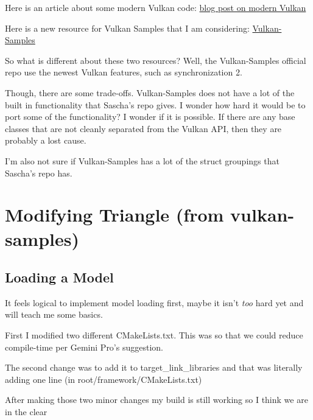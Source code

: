 \documentclass{article}
\begin{document}
\par Here is an article about some modern Vulkan code:
\href{https://medium.com/@allenphilip78/using-modern-vulkan-in-2025-0bac45174304}{blog
post on modern Vulkan}

\par Here is a new resource for Vulkan Samples that I am considering:
\href{https://github.com/KhronosGroup/Vulkan-Samples}{Vulkan-Samples}

\par So what is different about these two resources? Well, the
Vulkan-Samples official repo use the newest Vulkan features, such as
synchronization 2.

\par Though, there are some trade-offs. Vulkan-Samples does not have
a lot of the built in functionality that Sascha's repo gives. I
wonder how hard it would be to port some of the functionality? I
wonder if it is possible. If there are any base classes that are not
cleanly separated from the Vulkan API, then they are probably a lost cause.

\par I'm also not sure if Vulkan-Samples has a lot of the struct
groupings that Sascha's repo has.

\section*{Modifying Triangle (from
vulkan-samples)}
\subsection*{Loading a Model}
\par It feels logical to implement model loading first, maybe it
isn't \textit{too} hard yet and will teach me some basics.

\par First I modified two different CMakeLists.txt. This was so that
we could reduce compile-time per Gemini Pro's suggestion.

\par The second change was to add it to target\_link\_libraries and
that was literally adding one line (in root/framework/CMakeLists.txt)

\par After making those two minor changes my build is still working
so I think we are in the clear
\end{document}
